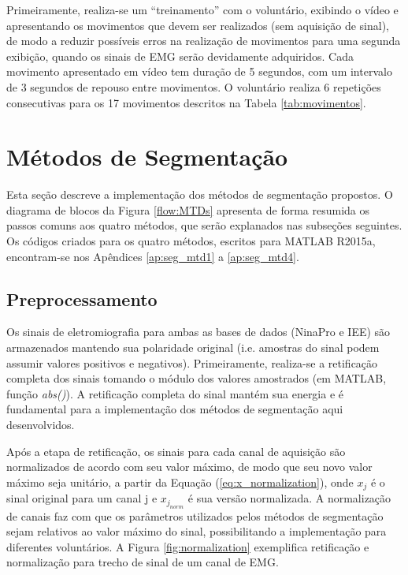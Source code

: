 Primeiramente, realiza-se um ``treinamento'' com o voluntário, exibindo o vídeo e apresentando os movimentos que devem ser realizados (sem aquisição de sinal), de modo a reduzir possíveis erros na realização de movimentos para uma segunda exibição, quando os sinais de EMG serão devidamente adquiridos. Cada movimento apresentado em vídeo tem duração de 5 segundos, com um intervalo de 3 segundos de repouso entre movimentos. O voluntário realiza 6 repetições consecutivas para os 17 movimentos descritos na Tabela \ref{tab:movimentos}.



		\section{Métodos de Segmentação}
Esta seção descreve a implementação dos métodos de segmentação propostos. O diagrama de blocos da Figura \ref{flow:MTDs} apresenta de forma resumida os passos comuns aos quatro métodos, que serão explanados nas subseções seguintes. Os códigos criados para os quatro métodos, escritos para MATLAB R2015a, encontram-se nos Apêndices \ref{ap:seg_mtd1} a \ref{ap:seg_mtd4}.



			\subsection {Preprocessamento}

Os sinais de eletromiografia para ambas as bases de dados (NinaPro e IEE) são armazenados mantendo sua polaridade original (i.e. amostras do sinal podem assumir valores positivos e negativos). Primeiramente, realiza-se a retificação completa dos sinais tomando o módulo dos valores amostrados (em MATLAB, função \emph{abs()}). A retificação completa do sinal mantém sua energia e é fundamental para a implementação dos métodos de segmentação aqui desenvolvidos.

Após a etapa de retificação, os sinais para cada canal de aquisição são normalizados de acordo com seu valor máximo, de modo que seu novo valor máximo seja unitário, a partir da Equação (\ref{eq:x_normalization}), onde $x_j$ é o sinal original para um canal j e $x_{j_{norm}}$ é sua versão normalizada. A normalização de canais faz com que os parâmetros utilizados pelos métodos de segmentação sejam relativos ao valor máximo do sinal, possibilitando a implementação para diferentes voluntários. A Figura \ref{fig:normalization} exemplifica retificação e normalização para trecho de sinal de um canal de EMG.

